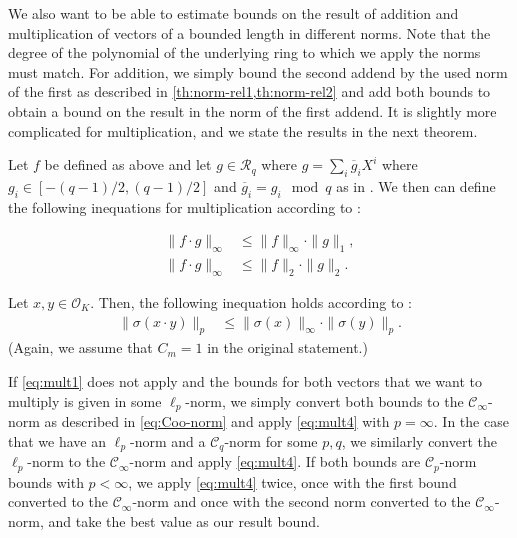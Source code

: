 We also want to be able to estimate bounds on the result of addition and multiplication of vectors of a bounded length in different norms. Note that the degree of the polynomial of the underlying ring to which we apply the norms must match. For addition, we simply bound the second addend by the used norm of the first as described in \cref{th:norm-rel1,th:norm-rel2} and add both bounds to obtain a bound on the result in the norm of the first addend. It is slightly more complicated for multiplication, and we state the results in the next theorem.

\begin{theorem}\label{th:mult}
    Let $f$ be defined as above and let $g \in \mathcal{R}_q$ where $g = \sum_i \overline{g}_i X^i$ where $g_i \in \left[-(q-1)/2, (q-1)/2\right]$ and $\overline{g}_i = g_i \mod q$ as in \cite{BDLOP18}. We then can define the following inequations for multiplication according to \cite{BDLOP18}:

    \begin{equation}\label{eq:mult1}
        \begin{aligned}
            \|f \cdot g\|_\infty & \leq \|f\|_\infty \cdot \|g\|_1, \\
            \|f \cdot g\|_\infty & \leq \|f\|_2 \cdot \|g\|_2.
        \end{aligned}
    \end{equation}

    Let $x, y \in \mathcal{O}_K$. Then, the following inequation holds according to \cite{DPSZ12}:
    \begin{align}
        \| \sigma(x \cdot y) \|_p & \leq  \| \sigma(x) \|_\infty \cdot \| \sigma(y) \|_p. \label{eq:mult4}
    \end{align}
    (Again, we assume that $C_m = 1$ in the original statement.)
\end{theorem}

If \cref{eq:mult1} does not apply and the bounds for both vectors that we want to multiply is given in some $\ell_p$-norm, we simply convert both bounds to the $\mathcal{C}_\infty$-norm as described in \cref{eq:Coo-norm} and apply \cref{eq:mult4} with $p=\infty$. In the case that we have an $\ell_p$-norm and a $\mathcal{C}_q$-norm for some $p,q$, we similarly convert the $\ell_p$-norm to the $\mathcal{C}_\infty$-norm and apply \cref{eq:mult4}. If both bounds are $\mathcal{C}_p$-norm bounds with $p < \infty$, we apply \cref{eq:mult4} twice, once with the first bound converted to the $\mathcal{C}_\infty$-norm and once with the second norm converted to the $\mathcal{C}_\infty$-norm, and take the best value as our result bound.


